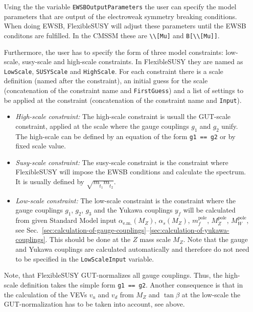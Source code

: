 \documentclass[final,3p,times,pdflatex]{elsarticle}
\newcommand{\fs}{FlexibleSUSY\xspace}
\newcommand{\code}[1]{\lstinline|#1|}  %
\newcommand{\pole}{\text{pole}}
\begin{document}
Using the the variable \code{EWSBOutputParameters} the user can
specify the model parameters that are output of the electroweak
symmetry breaking conditions.  When doing EWSB, \fs will adjust these
parameters until the EWSB conditons are fulfilled.  In the CMSSM these
are \code{\\[Mu]} and \code{B[\\[Mu]]}.

Furthermore, the user has to specify the form of three model
constraints: low-scale, susy-scale and high-scale constraints.  In \fs
they are named as \code{LowScale}, \code{SUSYScale} and
\code{HighScale}.  For each constraint there is a scale definition
(named after the constraint), an initial guess for the scale
(concatenation of the constraint name and \code{FirstGuess}) and a
list of settings to be applied at the constraint (concatenation of the
constraint name and \code{Input}).
%
\begin{itemize}
\item \emph{High-scale constraint:} The high-scale constraint is
  usuall the GUT-scale constraint, applied at the scale where the
  gauge couplings $g_1$ and $g_2$ unify.  The high-scale can be
  defined by an equation of the form \code{g1 == g2} or by fixed scale
  value.
\item \emph{Susy-scale constraint:} The susy-scale constraint is the
  constraint where \fs will impose the EWSB conditions and calculate
  the spectrum.  It is usually defined by
  $\sqrt{m_{\tilde{t}_1}m_{\tilde{t}_2}}$.
\item \emph{Low-scale constraint:} The low-scale constraint is the
  constraint where the gauge couplings $g_1$, $g_2$, $g_3$ and the
  Yukawa couplings $y_f$ will be calculated from given Standard Model
  input $\alpha_{\text{e.m.}}(M_Z)$, $\alpha_{s}(M_Z)$, $m_f^\pole$,
  $M_Z^\pole$, $M_W^\pole$, see
  Sec.~\ref{sec:calculation-of-gauge-couplings}--\ref{sec:calculation-of-yukawa-couplings}.
  This should be done at the $Z$ mass scale $M_Z$.  Note that the
  gauge and Yukawa couplings are calculated automatically and
  therefore do not need to be specified in the \code{LowScaleInput}
  variable.
\end{itemize}
%
Note, that \fs GUT-normalizes all gauge couplings.  Thus, the
high-scale definition takes the simple form \code{g1 == g2}.  Another
consequence is that in the calculation of the VEVs $v_u$ and $v_d$
from $M_Z$ and $\tan\beta$ at the low-scale the GUT-normalization has
to be taken into account, see above.
\end{document}
